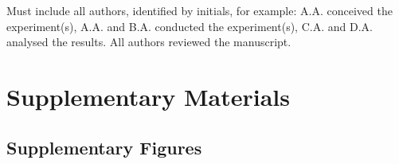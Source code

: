 \documentclass[fleqn,10pt]{wlscirep}
\begin{document}
Must include all authors, identified by initials, for example:
A.A. conceived the experiment(s),  A.A. and B.A. conducted the experiment(s), C.A. and D.A. analysed the results.  All authors reviewed the manuscript. 

\clearpage

\section*{Supplementary Materials}

\subsection*{Supplementary Figures}


\end{document}
